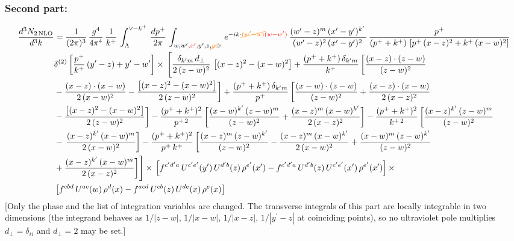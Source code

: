 \documentclass[9pt]{article}
\numberwithin{equation}{section}
\begin{document}
\subsubsection{Second part:\,}
\begin{align}
    \frac{d^{3}N_{2\,\rm NLO}}{d^{3}k} & =  \frac{1}{(2\pi)^{3}}\,\frac{g^{4}}{4\pi^{4}}\, \frac{1}{k^{+}}\,\int_{\Lambda}^{\vee-k^{+}}\, \frac{dp^{+}}{2\pi}\, \int_{w,w',{\color{red}x',}y',z,{\color{orange}\cancel{y,}}x}\, e^{-ik\cdot {\color{orange}\cancel{(w'-w)}}{\color{red}(w-w')}}\, \frac{(w'-z)^{m}\,(x'-y')^{k'}\,}{(w'-z)^{2}\,(x'-y')^{2}\,}\, \frac{p^{+}}{(p^{+}+k^{+})\,\left[p^{+}\,(x-z)^{2}+k^{+}\,(x-w)^{2}\right]}\notag \\ & \delta^{(2)}\left[\frac{p^{+}}{k^{+}}\, (y'-z)+y'-w'\right]\times\, \Bigg[\frac{\delta_{k'm}\,d_{\perp}}{2\,(z-w)^{2}}\, \left[(x-z)^{2}-(x-w)^{2}\right]+\frac{(p^{+}+k^{+})\,\delta_{k'm}}{k^{+}}\,\bigg[\frac{(x-z)\cdot (z-w)}{(z-w)^{2}}\notag \\ & -\frac{(x-z)\cdot (x-w)}{2\,(x-w)^{2}}-\frac{\left[(x-z)^{2}-(x-w)^{2}\right]}{2\,(z-w)^{2}}\bigg]+\frac{(p^{+}+k^{+})\,\delta_{k'm}}{p^{+}}\,\bigg[\frac{(x-w)\cdot (z-w)}{(z-w)^{2}}+\frac{(x-z)\cdot (x-w)}{2\,(x-z)^{2}}\notag \\ & -\frac{\left[(x-z)^{2}-(x-w)^{2}\right]}{2\,(z-w)^{2}}\bigg]-\frac{(p^{+}+k^{+})^{2}}{p^{+\,2}}\,\bigg[\frac{(x-w)^{k'}\,(z-w)^{m}}{(z-w)^{2}}+\frac{(x-z)^{m}\,(x-w)^{k'}}{2\,(x-z)^{2}}\bigg]-\frac{(p^{+}+k^{+})^{2}}{k^{+\,2}}\,\bigg[\frac{(x-z)^{k'}\,(z-w)^{m}}{(z-w)^{2}}\notag \\ & -\,\frac{(x-z)^{k'}\,(x-w)^{m}}{2\,(x-w)^{2}}\bigg]-\frac{(p^{+}+k^{+})^{2}}{p^{+}\,k^{+}}\,\bigg[\frac{(x-z)^{m}\,(z-w)^{k'}}{(z-w)^{2}}-\frac{(x-z)^{m}\,(x-w)^{k'}}{2\,(x-w)^{2}}+\frac{(x-w)^{m}\,(z-w)^{k'}}{(z-w)^{2}}\notag \\ & +\frac{(x-z)^{k'}\,(x-w)^{m}}{2\,(x-z)^{2}}\bigg]\Bigg]\times\,\left[f^{c'd'a}\,U^{c'e'}(y')\,U^{d'b}(z)\,\rho^{e'}(x')-f^{c'd'a}\, 
    U^{d'b}(z)\,U^{c'e'}(x')\,\rho^{e'}(x')\right]\times \notag \\ & \left[f^{cbd}\,U^{ac}(w)\,\rho^{d}(x) -f^{acd}\,U^{cb}(z)\,U^{de}(x)\,\rho^{e}(x)\right]
\end{align} {\color{red}[Only the phase and the list of integration variables are changed. The transverse integrals of this part are locally integrable in two dimensions (the integrand behaves as $1/|z-w|$, $1/|x-w|$, $1/|x-z|$, $1/|y^{\prime}-z|$ at coinciding points), so no ultraviolet pole multiplies $d_{\perp}=\delta_{ii}$ and $d_{\perp}=2$ may be set.]}\par\noindent 
\end{document}
